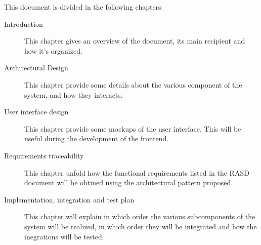 This document is divided in the following chapters:
\begin{description}
    \item [Introduction] This chapter gives an overview of the document, its main recipient and how it's organized.
    \item [Architectural Design] This chapter provide some details about the various component of the system, and how they interacts. 
    \item [User interface design] This chapter provide some mockups of the user interface. This will be useful during the development of the frontend.
    \item [Requirements traceability] This chapter unfold how the functional requirements listed in the RASD document will be obtined using the architectural pattern proposed. 
    \item [Implementation, integration and test plan] This chapter will explain in which order the various subcomponents of the system will be realized, in which order they will be integrated and how the inegrations will be tested.
\end{description}